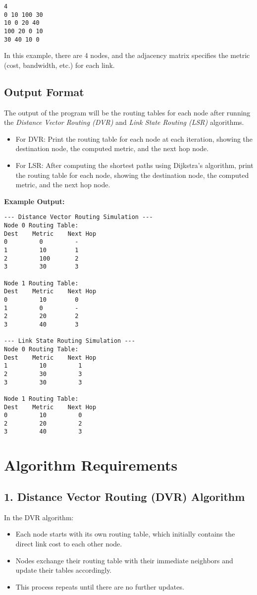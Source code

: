 \documentclass[12pt,a4paper]{article}
\begin{document}
\begin{verbatim}
4 
0 10 100 30 
10 0 20 40 
100 20 0 10 
30 40 10 0
\end{verbatim}

In this example, there are 4 nodes, and the adjacency matrix specifies the metric (cost, bandwidth, etc.) for each link.

\subsection*{Output Format}
The output of the program will be the routing tables for each node after running the \emph{Distance Vector Routing (DVR)} and \emph{Link State Routing (LSR)} algorithms. 

\begin{itemize}
    \item For DVR: Print the routing table for each node at each iteration, showing the destination node, the computed metric, and the next hop node.
    \item For LSR: After computing the shortest paths using Dijkstra's algorithm, print the routing table for each node, showing the destination node, the computed metric, and the next hop node.
\end{itemize}

\textbf{Example Output:}

\begin{verbatim}
--- Distance Vector Routing Simulation ---
Node 0 Routing Table:
Dest    Metric    Next Hop
0         0         -
1         10        1
2         100       2
3         30        3

Node 1 Routing Table:
Dest    Metric    Next Hop
0         10        0
1         0         -
2         20        2
3         40        3

--- Link State Routing Simulation ---
Node 0 Routing Table:
Dest    Metric    Next Hop
1         10         1
2         30         3
3         30         3

Node 1 Routing Table:
Dest    Metric    Next Hop
0         10         0
2         20         2
3         40         3
\end{verbatim}

\section*{Algorithm Requirements}

\subsection*{1. Distance Vector Routing (DVR) Algorithm}
In the DVR algorithm:
\begin{itemize}
    \item Each node starts with its own routing table, which initially contains the direct link cost to each other node.
    \item Nodes exchange their routing table with their immediate neighbors and update their tables accordingly.
    \item This process repeats until there are no further updates.
\end{itemize}
\end{document}
